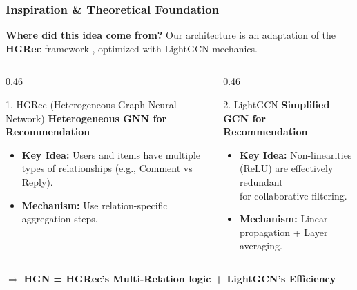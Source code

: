 \documentclass{beamer}
\begin{document}
\begin{frame}
    \frametitle{Inspiration \& Theoretical Foundation}
    \textbf{Where did this idea come from?}
    Our architecture is an adaptation of the \textbf{HGRec} framework \cite{shi2020hgrec}, optimized with LightGCN \cite{he2020lightgcn} mechanics.

    \vspace{0.3cm}
    \begin{columns}[T,onlytextwidth]
        \begin{column}{0.46\textwidth}
            \begin{block}{1. HGRec (Heterogeneous Graph Neural Network)}
                \textbf{Heterogeneous GNN for Recommendation}
                \begin{itemize}
                    \item \textbf{Key Idea:} Users and items have multiple types of relationships (e.g., Comment vs Reply).
                    \item \textbf{Mechanism:} Use relation-specific aggregation steps.
                \end{itemize}
            \end{block}
        \end{column}

        \begin{column}{0.46\textwidth}
            \begin{block}{2. LightGCN}
                \textbf{Simplified GCN for Recommendation}
                \begin{itemize}
                    \item \textbf{Key Idea:} Non-linearities (ReLU) are effectively redundant \\
                          for collaborative filtering.
                    \item \textbf{Mechanism:} Linear propagation + Layer averaging.
                \end{itemize}
            \end{block}
        \end{column}
    \end{columns}

    \vspace{0.2cm}
    \centering
    $\Rightarrow$ \textbf{HGN = HGRec's Multi-Relation logic + LightGCN's Efficiency}
\end{frame}
\end{document}
